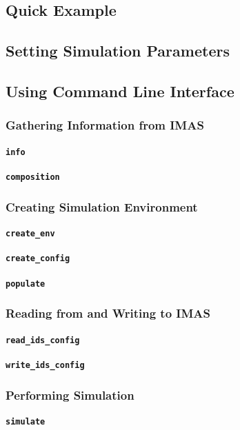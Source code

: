 \documentclass[../main.tex]{subfiles}
\begin{document}
\subsection{Quick Example}
\subsection{Setting Simulation Parameters}
\subsection{Using Command Line Interface}
\subsubsection{Gathering Information from IMAS}
\paragraph{\texttt{info}}
\paragraph{\texttt{composition}}
\subsubsection{Creating Simulation Environment}
\paragraph{\texttt{create\_env}}
\paragraph{\texttt{create\_config}}
\paragraph{\texttt{populate}}
\subsubsection{Reading from and Writing to IMAS}
\paragraph{\texttt{read\_ids\_config}}
\paragraph{\texttt{write\_ids\_config}}
\subsubsection{Performing Simulation}
\paragraph{\texttt{simulate}}
\end{document}
